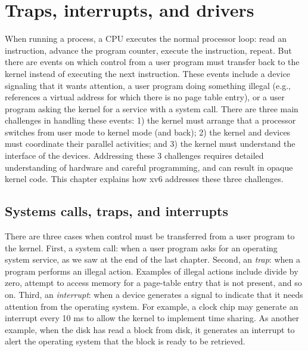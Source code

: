 \chapter{Traps, interrupts, and drivers}
\label{CH:TRAP}

When running a process, a CPU executes the normal processor loop: read an
instruction, advance the program counter, execute the instruction, repeat.  But
there are events on which control from a user program must transfer back to the
kernel instead of executing the next instruction.  These events include a device
signaling that it wants attention, a user program doing something illegal (e.g.,
references a virtual address for which there is no page table entry), or a user
program asking the kernel for a service with a system call.  There are three
main challenges in handling these events: 1) the kernel must arrange that a
processor switches from user mode to kernel mode (and back); 2) the kernel and
devices must coordinate their parallel activities; and 3) the kernel must
understand the interface of the devices.  Addressing these 3 challenges requires
detailed understanding of hardware and careful programming, and can result in
opaque kernel code.  This chapter explains how xv6 addresses these three
challenges.

\section{Systems calls, traps, and interrupts}

There are three cases when control must be transferred from a user program to
the kernel. First, a system call: when a user program asks for an operating
system service, as we saw at the end of the last chapter.
Second, an
\textit{trap}:
when a program performs an illegal action. Examples of illegal actions include
divide by zero, attempt to access memory for a page-table entry that is not
present, and so on.  Third, an
\textit{interrupt}:
when a device generates a signal to indicate that
it needs attention from the operating system.  For example, a clock chip may
generate an interrupt every 10 ms to allow the kernel to implement
time sharing.  As another example, when the disk has read a block from
disk, it generates an interrupt to alert the operating system that the
block is ready to be retrieved.


